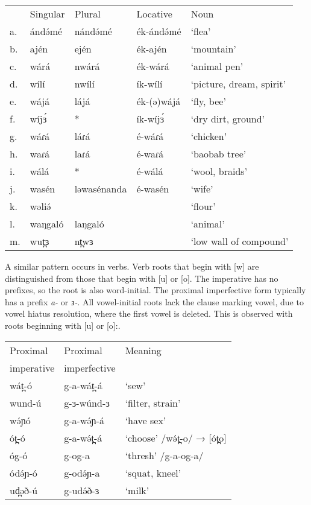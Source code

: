 \ea \begin{supertabular}[t]{lllll}
 	&	Singular	&	Plural	&	Locative 	& 	Noun\\
a.	&	ándə́mé		&	nándə́mé	&	ék-ándə́mé		&	‘flea’\\
b.	&	ajén		&	ején		&	ék-ajén		&	‘mountain’\\

c.	&	wárá		&	nwárá	&	ék-wárá		&	‘animal pen’\\
d.	&	wílí		&	nwílí	&	ík-wílí		&	‘picture, dream, spirit’\\
e.	&	wájá		&	lájá	 	&	ék-(ə)wájá	&	‘fly, bee’\\
f.	&	wíjɜ́		&	*		&	ík-wíjɜ́		&	‘dry dirt, ground’\\

g.	&	wáɾá		&	láɾá	&	é-wáɾá		&	‘chicken’\\
h.	&	waɾá		&	laɾá	&	é-waɾá		&	‘baobab tree’\\
i.	&	wálá		&	*		&	é-wálá		&	‘wool, braids’\\
j.	&	wasén		&	ləwasénanda	&	é-wasén	&	‘wife’\\

k.	&	wəliə́		&			&				&	‘flour’\\
l.	&	waŋgaló		&	laŋgaló	&				&	‘animal’\\
m.	&	wut̪ɜ		&	nt̪wɜ	&				&	‘low wall of compound’\\
\end{supertabular}\label{ex:ch2:10}
\z 

A similar pattern occurs in verbs. Verb roots that begin with [w] are distinguished from those that begin with [u] or [o]. The imperative has no prefixes, so the root is also word-initial. The proximal imperfective form typically has a prefix \textit{a-} or \textit{ɜ-}. All vowel-initial roots lack the clause marking vowel, due to vowel hiatus resolution, where the first vowel is deleted. This is observed with roots beginning with [u] or [o]:. 

\ea	
\begin{center}
\begin{tabular}[t]{lll}
	Proximal	&	Proximal 	&	Meaning\\ 
	imperative	&	imperfective \\
 	wát̪-ó		&	g-a-wát̪-á	&	‘sew’\\
	wund-ú		&	g-ɜ-wúnd-ɜ	&	‘filter, strain’\\
	wə́ɲó			&	g-a-wə́ɲ-á	&	‘have sex’\\
	ót̪-ó		&	g-a-wə́t̪-á	&	‘choose’		/wə́t̪-o/ → [ót̪o]\\
	óg-ó		&	g-og-a		&	‘thresh’		/g-a-og-a/\\
	ódə́ɲ-ó		&	g-odə́ɲ-a		&	‘squat, kneel’\\
	ud̪əð-ú		&	g-udə́ð-ɜ		&	‘milk’
	\end{tabular}\label{ex:ch2:11}
\end{center}
\z

